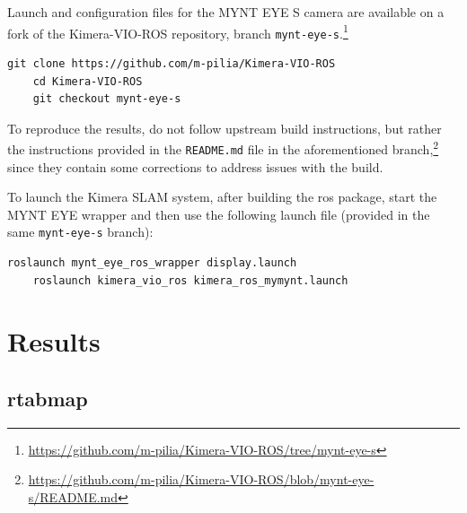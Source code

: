 \documentclass[11pt, letterpaper, twoside]{article}
\begin{document}
Launch and configuration files for the MYNT EYE S camera are available on a
fork of the Kimera-VIO-ROS repository, branch
\texttt{mynt-eye-s}.\footnote{\url{https://github.com/m-pilia/Kimera-VIO-ROS/tree/mynt-eye-s}}

\begin{Verbatim}[samepage=true]
    git clone https://github.com/m-pilia/Kimera-VIO-ROS
    cd Kimera-VIO-ROS
    git checkout mynt-eye-s
\end{Verbatim}

To reproduce the results, do not follow upstream build instructions, but rather
the instructions provided in the \texttt{README.md} file in the aforementioned
branch,\footnote{\url{https://github.com/m-pilia/Kimera-VIO-ROS/blob/mynt-eye-s/README.md}}
since they contain some corrections to address issues with the build.

To launch the Kimera SLAM system, after building the \gls{ros} package, start
the MYNT EYE wrapper and then use the following launch file (provided in the
same \texttt{mynt-eye-s} branch):
\begin{Verbatim}[samepage=true]
    roslaunch mynt_eye_ros_wrapper display.launch
    roslaunch kimera_vio_ros kimera_ros_mymynt.launch
\end{Verbatim}

\section{Results}

\subsection{\acs{rtabmap}}
\end{document}
